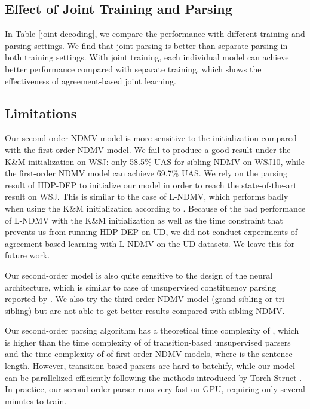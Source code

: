 \documentclass[11pt]{article}
\begin{document}
\subsection{Effect of Joint Training and Parsing}
In Table \ref{joint-decoding}, we compare the performance with different training and parsing settings. We find that joint parsing is better than separate parsing in both training settings. With joint training, each individual model can achieve better performance compared with separate training, which shows the effectiveness of agreement-based joint learning.  




\subsection{Limitations}
Our second-order NDMV model is more sensitive to the initialization compared with the first-order NDMV model. We fail to produce a good result under the K\&M initialization on WSJ: only 58.5\% UAS for sibling-NDMV on WSJ10, while the first-order NDMV model can achieve 69.7\% UAS. We rely on the parsing result of HDP-DEP to initialize our model in order to reach the state-of-the-art result on WSJ. This is similar to the case of L-NDMV, which performs badly when using the K\&M initialization according to . Because of the bad performance of L-NDMV with the K\&M initialization as well as the time constraint that prevents us from running HDP-DEP on UD, we did not conduct experiments of agreement-based learning with L-NDMV on the UD datasets. We leave this for future work. 
 
Our second-order model is also quite sensitive to the design of the neural architecture, which is similar to case of unsupervised constituency parsing reported by . We also try the third-order NDMV model (grand-sibling or tri-sibling) but are not able to get better results compared with sibling-NDMV. 

Our second-order parsing algorithm has a theoretical time complexity of , which is higher than the time complexity of  of transition-based unsupervised parsers \cite{Li2018DependencyGI} and the time complexity of  of first-order NDMV models, where  is the sentence length. However, transition-based parsers are hard to batchify, while our model can be parallelized efficiently following the methods introduced by Torch-Struct \cite{rush-2020-torch}. In practice, our second-order parser runs very fast on GPU, requiring only several minutes to train.
\end{document}
